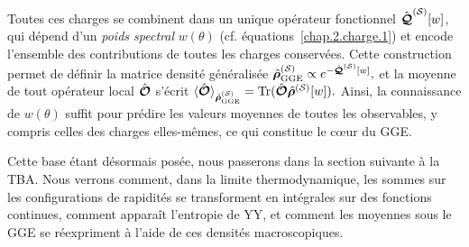 \medskip


Toutes ces charges se combinent dans un unique opérateur fonctionnel 
\(
\hat{\bm{\mathcal{Q}}}^{(\mathcal{S})}[w]
\),
qui dépend d’un \emph{poids spectral} \(w(\theta)\) (cf. équations~\eqref{chap.2.charge.1}) et encode l’ensemble des contributions de toutes les charges conservées. 
Cette construction permet de définir la matrice densité généralisée
\(
\hat{\bm{\rho}}^{(\mathcal{S})}_{\mathrm{GGE}} \propto e^{-\hat{\bm{\mathcal{Q}}}^{(\mathcal{S})}[w]} ,
\) 
et la moyenne de tout opérateur local \(\hat{\bm{\mathcal{O}}}\) s’écrit
\(
\langle \hat{\bm{\mathcal{O}}}\rangle_{\hat{\bm{\rho}}^{(\mathcal{S})}_{\mathrm{GGE}}} = \mathrm{Tr}(\hat{\bm{\mathcal{O}}} \hat{\bm{\rho}}^{(\mathcal{S})}[w]).
\) 
Ainsi, la connaissance de \(w(\theta)\) suffit pour prédire les valeurs moyennes de toutes les observables, y compris celles des charges elles-mêmes, ce qui constitue le cœur du \gls{GGE}.


\medskip


Cette base étant désormais posée, nous passerons dans la section suivante à la \gls{TBA}. 
Nous verrons comment, dans la limite thermodynamique, les sommes sur les configurations de rapidités se transforment en intégrales sur des fonctions continues, comment apparaît l’entropie de \gls{YY}, et comment les moyennes sous le \gls{GGE} se réexpriment à l’aide de ces densités macroscopiques.

